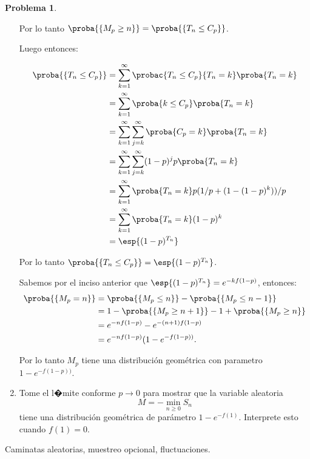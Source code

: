 \documentclass[a5paper,oneside]{amsart}
\theoremstyle{plain}
\theoremstyle{definition}
\newtheorem{problema}{Problema}
\begin{document}
\begin{problema}
\begin{enumerate}
Por lo tanto $\proba{\{M_p\geq n\}}=\proba{ \{T_n\leq C_p \}}$.

Luego entonces:

\begin{align}
\proba{ \{T_n\leq C_p \}}&= \sum_{k=1}^\infty \probac{T_n\leq C_p}{T_n=k}\proba{T_n=k}\notag \\
&= \sum_{k=1}^\infty \proba{k\leq C_p}\proba{T_n=k} \notag \\
&= \sum_{k=1}^\infty \sum_{j=k}^\infty \proba{C_p=k}\proba{T_n=k} \notag \\
&= \sum_{k=1}^\infty \sum_{j=k}^\infty (1-p)^j p\proba{T_n=k} \notag \\
&= \sum_{k=1}^\infty\proba{T_n=k}p(1/p +(1-(1-p)^k))/p \notag \\
&= \sum_{k=1}^\infty\proba{T_n=k}(1-p)^k \notag \\
&=\esp{(1-p)^{T_n}} \notag
\end{align} 

Por lo tanto $\proba{ \{T_n\leq C_p \}}=\esp{(1-p)^{T_n}}$.

Sabemos por el inciso anterior que $\esp{(1-p)^{T_n}}=e^{-k f(1-p)}$, entonces:
\begin{align}
\proba{\{M_p= n\}}&=\proba{\{M_p\leq n\}}-\proba{\{M_p\leq n-1\}}\notag \\
&=1-\proba{\{M_p\geq n+1\}}-1+\proba{\{M_p\geq n\}}\notag \\
&=e^{-n f(1-p)}-e^{-(n+1) f(1-p)}\notag \\
&=e^{-n f(1-p)}(1-e^{-f(1-p))}.\notag
\end{align}

Por lo tanto $M_p$ tiene una distribuci\'on geom\'etrica con parametro $1-e^{-f(1-p))}$.

\item Tome el l�mite conforme \(p\to 0\) para mostrar que la variable aleatoria $$M=-\min_{n\geq 0}S_n$$tiene una distribuci\'on geom\'etrica de par\'ametro \(1-e^{-f(1)}\). Interprete esto cuando \(f(1)=0\).
\end{enumerate}

 Caminatas aleatorias, muestreo opcional, fluctuaciones.
\end{problema}
\end{document}
